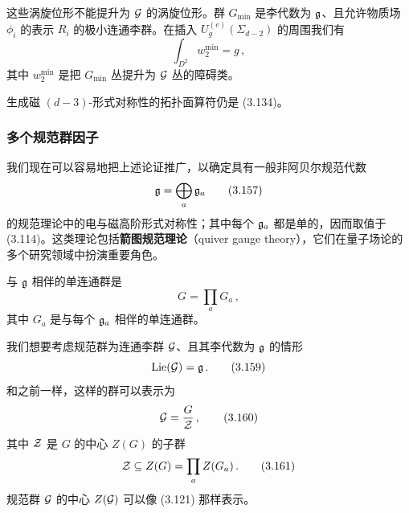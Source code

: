 

这些涡旋位形不能提升为 $\mathcal{G}$ 的涡旋位形。群 $G_{\min}$ 是李代数为 $\mathfrak{g}$、且允许物质场 $\phi_i$ 的表示 $R_i$ 的极小连通李群。在插入 $U_g^{(e)}(\Sigma_{d-2})$ 的周围我们有
\begin{equation}
    \int_{D^2} w_2^{\min} = g \,,
    \tag{3.156}
\end{equation}
其中 $w_2^{\min}$ 是把 $G_{\min}$ 丛提升为 $\mathcal{G}$ 丛的障碍类。

生成磁 $(d-3)$-形式对称性的拓扑面算符仍是 (3.134)。

\subsubsection{多个规范群因子}

我们现在可以容易地把上述论证推广，以确定具有一般非阿贝尔规范代数
\begin{equation}
    \mathfrak{g} = \bigoplus_a \mathfrak{g}_a
    \tag{3.157}
\end{equation}
的规范理论中的电与磁高阶形式对称性；其中每个 $\mathfrak{g}_a$ 都是单的，因而取值于 (3.114)。这类理论包括\textbf{箭图规范理论}（quiver gauge theory），它们在量子场论的多个研究领域中扮演重要角色。

与 $\mathfrak{g}$ 相伴的单连通群是
\begin{equation}
    G = \prod_a G_a \,,
    \tag{3.158}
\end{equation}
其中 $G_a$ 是与每个 $\mathfrak{g}_a$ 相伴的单连通群。

我们想要考虑规范群为连通李群 $\mathcal{G}$、且其李代数为 $\mathfrak{g}$ 的情形
\begin{equation}
    \mathrm{Lie}(\mathcal{G}) = \mathfrak{g} \,.
    \tag{3.159}
\end{equation}
和之前一样，这样的群可以表示为
\begin{equation}
    \mathcal{G} = \frac{G}{\mathcal{Z}} \,,
    \tag{3.160}
\end{equation}
其中 $\mathcal{Z}$ 是 $G$ 的中心 $Z(G)$ 的子群
\begin{equation}
    \mathcal{Z} \subseteq Z(G) = \prod_a Z(G_a) \,.
    \tag{3.161}
\end{equation}
规范群 $\mathcal{G}$ 的中心 $Z(\mathcal{G})$ 可以像 (3.121) 那样表示。


